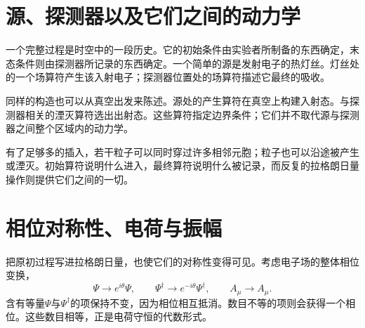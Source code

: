 \section{源、探测器以及它们之间的动力学}

一个完整过程是时空中的一段历史。它的初始条件由实验者所制备的东西确定，末态条件则由探测器所记录的东西确定。一个简单的源是发射电子的热灯丝。灯丝处的一个场算符产生该入射电子；探测器位置处的场算符描述它最终的吸收。

\begin{classroomqa}
\end{classroomqa}

同样的构造也可以从真空出发来陈述。源处的产生算符在真空上构建入射态。与探测器相关的湮灭算符选出出射态。这些算符指定边界条件；它们并不取代源与探测器之间整个区域内的动力学。

\begin{classroomqa}
\end{classroomqa}

有了足够多的插入，若干粒子可以同时穿过许多相邻元胞；粒子也可以沿途被产生或湮灭。初始算符说明什么进入，最终算符说明什么被记录，而反复的拉格朗日量操作则提供它们之间的一切。

\begin{classroomqa}
\end{classroomqa}

\section{相位对称性、电荷与振幅}

把原初过程写进拉格朗日量，也使它们的对称性变得可见。考虑电子场的整体相位变换，
\begin{equation}
\Psi\longrightarrow e^{i\theta}\Psi,
\qquad
\Psi^\dagger\longrightarrow e^{-i\theta}\Psi^\dagger,
\qquad
A_\mu\longrightarrow A_\mu.
\end{equation}
含有等量\(\Psi\)与\(\Psi^\dagger\)的项保持不变，因为相位相互抵消。数目不等的项则会获得一个相位。这些数目相等，正是电荷守恒的代数形式。


